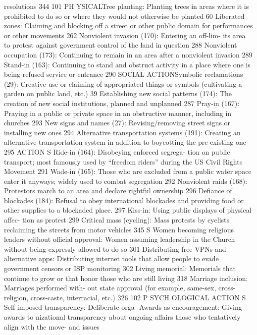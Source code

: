 \documentclass[twoside,a4paper,12pt,fleqn,openany]{extbook}
\begin{document}
resolutions
 344
101
PH YSICALTree planting: Planting trees in areas where it
is prohibited to do so or where they would not
otherwise be planted
 60
Liberated zones: Claiming and blocking off a
street or other public domain for performances
or other movements
 262
Nonviolent invasion (170): Entering an off-lim-
its area to protest against government control
of the land in question
 288
Nonviolent occupation (173): Continuing to
remain in an area after a nonviolent invasion		
289
Stand-in (163): Continuing to stand and obstruct
activity in a place where one is being refused
service or entrance
 290
SOCIAL ACTIONSymbolic reclamations (29): Creative use or
claiming of appropriated things or symbols
(cultivating a garden on public land, etc.) 39
Establishing new social patterns (174): The
creation of new social institutions, planned and
unplanned
 287
Pray-in (167): Praying in a public or private
space in an obstructive manner, including in
churches
 293
New signs and names (27): Revising/removing
street signs or installing new ones
 294
Alternative transportation systems (191):
Creating an alternative transportation system
in addition to boycotting the pre-existing
one
 295
ACTION S
Ride-in (164): Disobeying enforced segrega-
tion on public transport; most famously used
by “freedom riders” during the US Civil Rights
Movement
 291
Wade-in (165): Those who are excluded from
a public water space enter it anyways; widely
used to combat segregation
 292
Nonviolent raids (168): Protestors march to an
area and declare rightful ownership
 296
Defiance of blockades (184): Refusal to obey
international blockades and providing food or
other supplies to a blockaded place.
 297
Kiss-in: Using public displays of physical affec-
tion as protest
 299
Critical mass (cycling): Mass protests by cyclists
reclaiming the streets from motor vehicles 345
S
Women becoming religious leaders without
official approval: Women assuming leadership
in the Church without being expressly allowed
to do so
 301
Distributing free VPNs and alternative
apps: Distributing internet tools that allow
people to evade government censors or ISP
monitoring
 302
Living memorial: Memorials that continue to
grow or that honor those who are still living		
318
Marriage inclusion: Marriages performed with-
out state approval (for example, same-sex,
cross-religion, cross-caste, interracial, etc.)		
326
102
P SYCH OLOGICAL ACTION S
Self-imposed transparency: Deliberate orga-
 Awards as encouragement: Giving awards to
nizational transparency about ongoing affairs
 those who tentatively align with the move-
and issues
\end{document}
